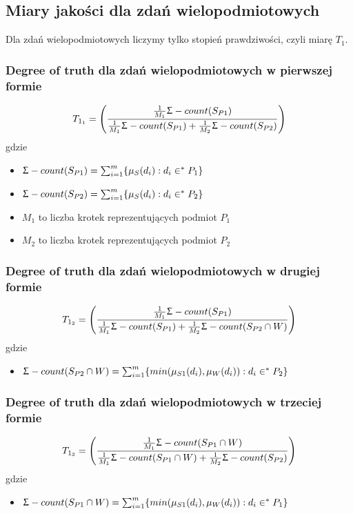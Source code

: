 \documentclass{classrep}
\begin{document}
\subsection{Miary jakości dla zdań wielopodmiotowych}
Dla zdań wielopodmiotowych liczymy tylko stopień prawdziwości, czyli miarę $T_1$.

\subsubsection{Degree of truth dla zdań wielopodmiotowych w pierwszej formie \cite{anarticle30}} 
\begin{equation}
T_{1_1} = \left(\frac{\frac{1}{M_1} \Upsigma-count(S_{P1})}
				{\frac{1}{M_1} \Upsigma-count(S_{P1}) + \frac{1}{M_2} \Upsigma-count(S_{P2})}\right)
\end{equation}
gdzie 
\begin{itemize}
	\item $\Upsigma-count(S_{P1}) = \sum_{i=1}^{m} \{\mu_{S}(d_i) : d_i \in^* P_1\}$
	\item $\Upsigma-count(S_{P2}) = \sum_{i=1}^{m} \{\mu_{S}(d_i) : d_i \in^* P_2\}$
	\item $M_1$ to liczba krotek reprezentujących podmiot $P_1$
	\item $M_2$ to liczba krotek reprezentujących podmiot $P_2$
\end{itemize}
\subsubsection{Degree of truth dla zdań wielopodmiotowych w drugiej formie \cite{anbookpl}} 
\begin{equation}
T_{1_2} = \left(\frac{\frac{1}{M_1} \Upsigma-count(S_{P1})}
				{\frac{1}{M_1} \Upsigma-count(S_{P1}) + \frac{1}{M_2} \Upsigma-count(S_{P2} \cap W )}\right)
\end{equation}
gdzie 
\begin{itemize}
	\item  $\Upsigma-count(S_{P2} \cap W ) = \sum_{i=1}^{m} \{min(\mu_{S1}(d_i), \mu_{W}(d_i)) : d_i \in^* P_2 \}  $
\end{itemize}
\subsubsection{Degree of truth dla zdań wielopodmiotowych w trzeciej formie \cite{anbookpl}} 
\begin{equation}
T_{1_3} = \left(\frac{\frac{1}{M_1} \Upsigma-count(S_{P1} \cap W)}
				{\frac{1}{M_1} \Upsigma-count(S_{P1} \cap W) + \frac{1}{M_2} \Upsigma-count(S_{P2} )}\right)
\end{equation}
gdzie 
\begin{itemize}
	\item  $\Upsigma-count(S_{P1} \cap W ) = \sum_{i=1}^{m} \{min(\mu_{S1}(d_i), \mu_{W}(d_i)) : d_i \in^* P_1 \}  $
\end{itemize}
\end{document}
